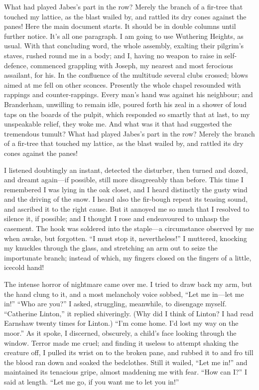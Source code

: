 What had played Jabes's part in the row?  Merely the branch of a fir-tree that
touched my lattice, as the blast wailed by, and rattled its dry cones
against the panes! Here the main document starts. It should be in double columns
 until
further notice.  It's all one paragraph. I am going to use Wuthering
Heights, as usual. With that concluding word, the whole assembly,
exalting their pilgrim's staves, rushed round me in a body; and I,
having no weapon to raise in self-defence, commenced grappling with
Joseph, my nearest and most ferocious assailant, for his. In the
confluence of the multitude several clubs crossed; blows aimed at me
fell on other sconces. Presently the whole chapel resounded with
rappings and counter-rappings. Every man's hand was against his
neighbour; and Branderham, unwilling to remain idle, pour\-ed forth his
zeal in a shower of loud taps on the boards of the pulpit, which
responded so smartly that at last, to my unspeakable relief, they woke
me. And what was it that had suggested the tremendous tumult? 
What had played Jabes's part in the row?  Merely the branch of a fir-tree that
touched my lattice, as the blast wailed by, and rattled its dry cones
against the panes! 

\singlecolumn                                 %
I listened doubtingly an instant, detected the
disturber, then turned and dozed, and dreamt again---if possible, still
more disagreeably than before.  This time I remembered I was lying in
the oak closet, and I heard distinctly the gusty wind and the driving of
the snow. I heard also the fir-bough repeat its teasing sound, and
ascribed it to the right cause.  But it annoyed me so much that I
resolved to silence it, if possible; and I thought I rose and
endeavoured to unhasp the casement. The hook was soldered into the
staple---a circumstance observed by me when awake, but forgotten. ``I
must stop it, nevertheless!'' I muttered, knocking my knuckles through
the glass, and stretching an arm out to seize the importunate branch;
instead of which, my fingers closed on the fingers of a little, icecold
hand!

\doublecolumns                               %
The intense horror of nightmare came over me.  I tried to draw
back my arm, but the hand clung to it, and a most melancholy voice
sobbed, ``Let me in---let me in!'' ``Who are you?'' I asked, struggling,
meanwhile, to disengage myself. ``Catherine Linton,'' it replied
shiveringly. (Why did I think of Linton? I had read Earnshaw twenty
times for Linton.) ``I'm come home. I'd lost my way on the moor.''  As
it spoke, I discerned, obscurely, a child's face looking through the
window. Terror made me cruel; and finding it useless to attempt shaking
the creature off, I pulled its wrist on to the broken pane, and rubbed
it to and fro till the blood ran down and soaked the bedclothes. Still
it wailed, ``Let me in!'' and maintained its tenacious gripe, almost
maddening me with fear. ``How can I?''  I said at length. ``Let me go,
if you want me to let you in!''

